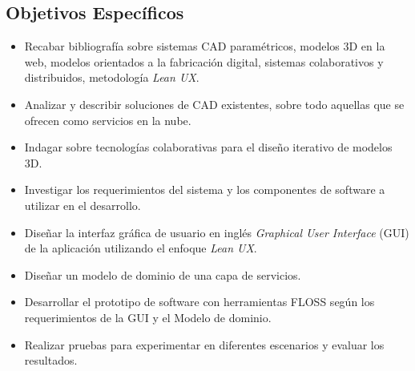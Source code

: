 \subsection {Objetivos Específicos}
\begin{itemize}
  \item Recabar bibliografía sobre sistemas CAD paramétricos, modelos 3D en la web, modelos orientados a la fabricación digital, sistemas colaborativos y distribuidos, metodología \textit{Lean UX}. 
  
  \item Analizar y describir soluciones de CAD existentes, sobre todo aquellas que se ofrecen como servicios en la nube.
  
  \item Indagar sobre tecnologías colaborativas para el diseño iterativo de modelos 3D.
  
  \item Investigar los requerimientos del sistema y los componentes de software a utilizar en el desarrollo.
  
  \item Diseñar la interfaz gráfica de usuario en inglés \textit{Graphical User Interface} (\Gls{GUI}) de la aplicación utilizando el enfoque \textit{Lean UX}.
  
  \item Diseñar un modelo de dominio de una capa de servicios.
  
  \item Desarrollar el prototipo de software con herramientas \Gls{FLOSS} \citep{stallman2007software}\citep{Stallman} según los requerimientos de la GUI y el Modelo de dominio.
  
  \item Realizar pruebas para experimentar en diferentes escenarios y evaluar los resultados.
\end{itemize}
